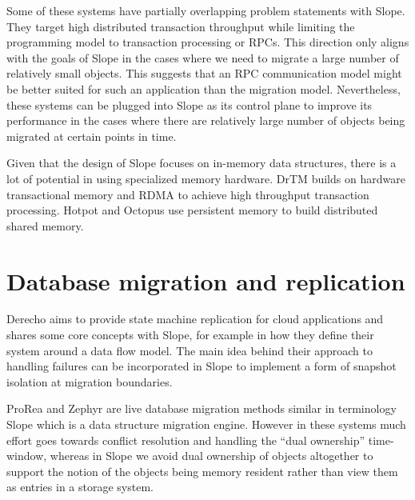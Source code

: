 Some of these systems have partially overlapping problem statements with
Slope. They target high distributed transaction throughput while limiting
the programming model to transaction processing or RPCs.
This direction only aligns with the goals of Slope in the cases where we
need to migrate a large number of relatively small objects. This suggests
that an RPC communication model might be better suited for such an
application than the migration model. Nevertheless, these systems
can be plugged into Slope as its control plane to improve its performance
in the cases where there are relatively large number of objects being
migrated at certain points in time.

Given that the design of Slope focuses on in-memory data structures, there
is a lot of potential in using specialized memory hardware. DrTM
\cite{drtm2017} builds on hardware transactional memory and RDMA
to achieve high throughput transaction processing.
Hotpot \cite{Shan2017distributed} and Octopus \cite{Lu2017rdmadistributed}
use persistent memory to build distributed shared memory.


\section{Database migration and replication}
Derecho \cite{jha2019derecho} aims to provide state machine replication
for cloud applications and shares some core concepts with Slope, for
    example in how they define their system around a data flow model.
    The main idea behind their approach to handling failures can be
    incorporated in Slope to implement a form of snapshot isolation at
    migration boundaries.

ProRea \cite{ProRea2013} and Zephyr \cite{zephyr2011elmore} are live
database migration methods similar in terminology Slope which is a
data structure migration engine. However in these systems much effort goes
towards conflict resolution and handling the ``dual ownership''
time-window, whereas in Slope we avoid dual ownership of objects
altogether to support the notion of the objects being memory resident
rather than view them as entries in a storage system.
